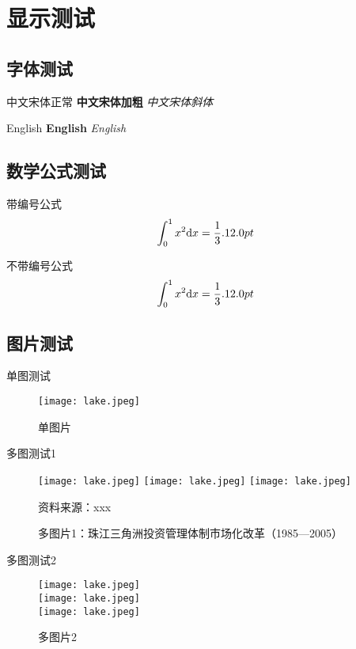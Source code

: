 \chapter{显示测试\the\baselineskip}
\the\baselineskip
\section{字体测试\the\baselineskip}
中文宋体正常 \textbf{中文宋体加粗} \textit{中文宋体斜体}\the\baselineskip

English \textbf{English} \textit{English}\the\baselineskip
\section{数学公式测试\the\baselineskip}
带编号公式\the\baselineskip
\begin{equation}
    \int_0^1 x^2 \mathrm{d}x = \frac{1}{3}.\the\baselineskip
\end{equation}

不带编号公式\the\baselineskip
\begin{equation*}
    \int_0^1 x^2 \mathrm{d}x = \frac{1}{3}.\the\baselineskip
\end{equation*}

\section{图片测试}
单图测试\the\baselineskip
\begin{figure}[h]
    \centering
    \texttt{[image: lake.jpeg]}
    \caption{单图片\the\baselineskip}
    \label{fig:singlePic}
\end{figure}

多图测试1
\begin{figure}[h]
    \centering
    \texttt{[image: lake.jpeg]}\hfill
    \texttt{[image: lake.jpeg]}\hfill
    \texttt{[image: lake.jpeg]}
    \caption{多图片1：珠江三角洲投资管理体制市场化改革（1985---2005）\the\baselineskip}
    { \songti 资料来源：xxx\the\baselineskip}
    \label{fig:MultiPic1}
\end{figure}

多图测试2
\begin{figure}[h]
    \centering
    \texttt{[image: lake.jpeg]}\\
    \texttt{[image: lake.jpeg]}\\
    \texttt{[image: lake.jpeg]}
    \caption{多图片2}
    \label{fig:MultiPic2}
\end{figure}

